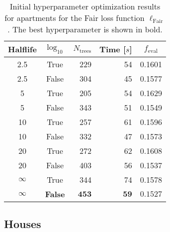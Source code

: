 \begin{table}[h!]
  \centerfloat
  \begin{tabular}{@{}ccrrc@{}}
    Halflife & $\log_{10}$ & $N_\mathrm{trees}$ & Time [$s$] & $f_\mathrm{eval}$ \\
    \midrule
    \num{2.5} & True & \num{229} & \num{54} & \num{0.1601} \\
    \num{2.5} & False & \num{304} & \num{45} & \num{0.1577} \\
    \num{5} & True & \num{205} & \num{54} & \num{0.1629} \\
    \num{5} & False & \num{343} & \num{51} & \num{0.1549} \\
    \num{10} & True & \num{257} & \num{61} & \num{0.1596} \\
    \num{10} & False & \num{332} & \num{47} & \num{0.1573} \\
    \num{20} & True & \num{272} & \num{62} & \num{0.1608} \\
    \num{20} & False & \num{403} & \num{56} & \num{0.1537} \\
    $\infty$ & True & \num{344} & \num{74} & \num{0.1578} \\
    $\bm{\infty}$ & \textbf{False} & $\mathbf{453}$ & $\mathbf{59}$ & $\mathbf{0.1527}$ \\
  \end{tabular}
  \caption[Initial Hyperparameter Optimization Results for Apartments -- Fair Loss Function]{\label{tab:h:HPO_initial_Fair-ejerlejlighed-appendix}Initial hyperparameter optimization results for apartments for the Fair loss function $\ell_\mathrm{Fair}$. The best hyperparameter is shown in bold.}
\end{table}



\clearpage
\FloatBarrier
\subsection*{Houses}




